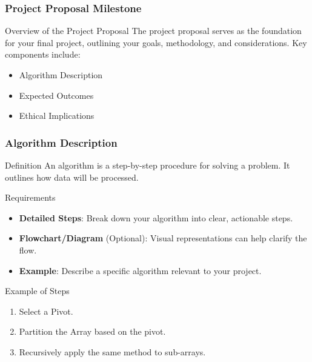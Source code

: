 \documentclass[aspectratio=169]{beamer}
\begin{document}
\begin{frame}[fragile]
    \frametitle{Project Proposal Milestone}
    \begin{block}{Overview of the Project Proposal}
        The project proposal serves as the foundation for your final project, outlining your goals, methodology, and considerations.
        Key components include:
        \begin{itemize}
            \item Algorithm Description
            \item Expected Outcomes
            \item Ethical Implications
        \end{itemize}
    \end{block}
\end{frame}

\begin{frame}[fragile]
    \frametitle{Algorithm Description}
    \begin{block}{Definition}
        An algorithm is a step-by-step procedure for solving a problem. It outlines how data will be processed.
    \end{block}

    \begin{block}{Requirements}
        \begin{itemize}
            \item \textbf{Detailed Steps}: Break down your algorithm into clear, actionable steps.
            \item \textbf{Flowchart/Diagram} (Optional): Visual representations can help clarify the flow.
            \item \textbf{Example}: Describe a specific algorithm relevant to your project.
        \end{itemize}
    \end{block}
    
    \begin{block}{Example of Steps}
        \begin{enumerate}
            \item Select a Pivot.
            \item Partition the Array based on the pivot.
            \item Recursively apply the same method to sub-arrays.
        \end{enumerate}
    \end{block}
\end{frame}
\end{document}
